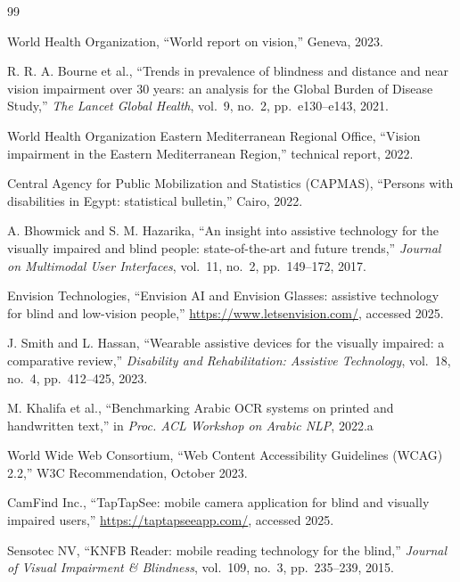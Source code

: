 \documentclass[11pt,a4paper]{article}
\begin{document}
\begin{thebibliography}{99}

World Health Organization, ``World report on vision,'' Geneva, 2023.

R. R. A. Bourne et al., ``Trends in prevalence of blindness and distance
and near vision impairment over 30 years: an analysis for the Global
Burden of Disease Study,'' \emph{The Lancet Global Health}, vol.\ 9,
no.\ 2, pp.\ e130--e143, 2021.

World Health Organization Eastern Mediterranean Regional Office,
``Vision impairment in the Eastern Mediterranean Region,'' technical
report, 2022.

Central Agency for Public Mobilization and Statistics (CAPMAS),
``Persons with disabilities in Egypt: statistical bulletin,'' Cairo,
2022.

A. Bhowmick and S. M. Hazarika, ``An insight into assistive technology
for the visually impaired and blind people: state-of-the-art and future
trends,'' \emph{Journal on Multimodal User Interfaces}, vol.\ 11, no.\
2, pp.\ 149--172, 2017.

Envision Technologies, ``Envision AI and Envision Glasses: assistive
technology for blind and low-vision people,''
\url{https://www.letsenvision.com/}, accessed 2025.

J. Smith and L. Hassan, ``Wearable assistive devices for the visually
impaired: a comparative review,'' \emph{Disability and Rehabilitation:
Assistive Technology}, vol.\ 18, no.\ 4, pp.\ 412--425, 2023.

M. Khalifa et al., ``Benchmarking Arabic OCR systems on printed and
handwritten text,'' in \emph{Proc. ACL Workshop on Arabic NLP}, 2022.a

World Wide Web Consortium, ``Web Content Accessibility Guidelines (WCAG)
2.2,'' W3C Recommendation, October 2023.

CamFind Inc., ``TapTapSee: mobile camera application for blind and
visually impaired users,''
\url{https://taptapseeapp.com/}, accessed 2025.

Sensotec NV, ``KNFB Reader: mobile reading technology for the blind,''
\emph{Journal of Visual Impairment \& Blindness}, vol.\ 109, no.\ 3,
pp.\ 235--239, 2015.


\end{thebibliography}
\end{document}
